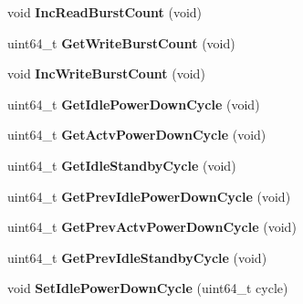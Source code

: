 \begin{DoxyCompactItemize}
\item 
\hypertarget{classMemRankBase_a1d167f969fd02e04f26d768545983d4c}{void {\bfseries Inc\-Read\-Burst\-Count} (void)}\label{classMemRankBase_a1d167f969fd02e04f26d768545983d4c}

\item 
\hypertarget{classMemRankBase_a1bc22aa65921f6a6991b6caa687101cf}{uint64\-\_\-t {\bfseries Get\-Write\-Burst\-Count} (void)}\label{classMemRankBase_a1bc22aa65921f6a6991b6caa687101cf}

\item 
\hypertarget{classMemRankBase_a1aec1d49d04e636233e9422f177d4690}{void {\bfseries Inc\-Write\-Burst\-Count} (void)}\label{classMemRankBase_a1aec1d49d04e636233e9422f177d4690}

\item 
\hypertarget{classMemRankBase_ac8fe72cb3949c1bed48d8ebcf3d39d2d}{uint64\-\_\-t {\bfseries Get\-Idle\-Power\-Down\-Cycle} (void)}\label{classMemRankBase_ac8fe72cb3949c1bed48d8ebcf3d39d2d}

\item 
\hypertarget{classMemRankBase_a9b844679d880587e58e3a764593fe8f1}{uint64\-\_\-t {\bfseries Get\-Actv\-Power\-Down\-Cycle} (void)}\label{classMemRankBase_a9b844679d880587e58e3a764593fe8f1}

\item 
\hypertarget{classMemRankBase_ae9b9b85028133dc860d765b0ad19544f}{uint64\-\_\-t {\bfseries Get\-Idle\-Standby\-Cycle} (void)}\label{classMemRankBase_ae9b9b85028133dc860d765b0ad19544f}

\item 
\hypertarget{classMemRankBase_a329967c85ffade127c3385cc06f49803}{uint64\-\_\-t {\bfseries Get\-Prev\-Idle\-Power\-Down\-Cycle} (void)}\label{classMemRankBase_a329967c85ffade127c3385cc06f49803}

\item 
\hypertarget{classMemRankBase_a1065074c17d3aa40095762f827c79592}{uint64\-\_\-t {\bfseries Get\-Prev\-Actv\-Power\-Down\-Cycle} (void)}\label{classMemRankBase_a1065074c17d3aa40095762f827c79592}

\item 
\hypertarget{classMemRankBase_a5e6065bf843b4448bd36843ca12de7c1}{uint64\-\_\-t {\bfseries Get\-Prev\-Idle\-Standby\-Cycle} (void)}\label{classMemRankBase_a5e6065bf843b4448bd36843ca12de7c1}

\item 
\hypertarget{classMemRankBase_a9bcf1119991fea47e6353a183a055f1b}{void {\bfseries Set\-Idle\-Power\-Down\-Cycle} (uint64\-\_\-t cycle)}\label{classMemRankBase_a9bcf1119991fea47e6353a183a055f1b}


\end{DoxyCompactItemize}
